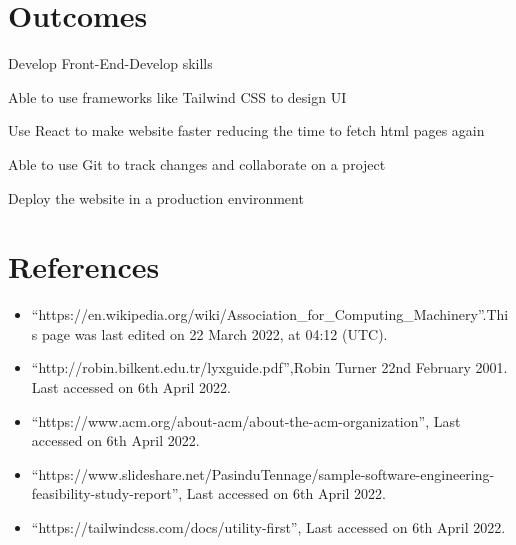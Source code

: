 \documentclass[english]{article}
\begin{document}
\section{Outcomes}

\noindent \textbullet{} Develop Front-End-Develop skills 

\noindent \textbullet{} Able to use frameworks like Tailwind CSS to
design UI 

\noindent \textbullet{} Use React to make website faster reducing
the time to fetch html pages again 

\noindent \textbullet{} Able to use Git to track changes and collaborate
on a project 

\noindent \textbullet{} Deploy the website in a production environment
\newpage{}

\section{References}
\begin{itemize}
\item ``https://en.wikipedia.org/wiki/Association\_for\_Computing\_Machinery''.This
page was last edited on 22 March 2022, at 04:12 (UTC).
\item ``http://robin.bilkent.edu.tr/lyxguide.pdf'',Robin Turner 22nd February
2001. Last accessed on 6th April 2022.
\item ``https://www.acm.org/about-acm/about-the-acm-organization'', Last
accessed on 6th April 2022.
\item ``https://www.slideshare.net/PasinduTennage/sample-software-engineering-feasibility-study-report'',
Last accessed on 6th April 2022.
\item ``https://tailwindcss.com/docs/utility-first'', Last accessed on
6th April 2022.
\end{itemize}
\newpage
\end{document}
